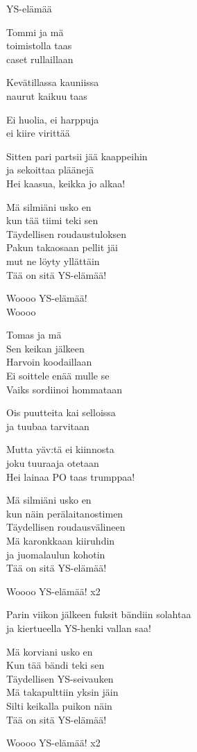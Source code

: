 \begin{song}{YS-elämää}

    Tommi ja mä\\
    toimistolla taas\\
    caset rullaillaan

    Kevätillassa kauniissa\\
    naurut kaikuu taas

    Ei huolia, ei harppuja\\
    ei kiire virittää

    Sitten pari partsii jää kaappeihin\\
    ja sekoittaa pläänejä\\
    Hei kaasua, keikka jo alkaa!

    Mä silmiäni usko en\\
    kun tää tiimi teki sen\\
    Täydellisen roudaustuloksen\\
    Pakun takaosaan pellit jäi\\
    mut ne löyty yllättäin\\
    Tää on sitä YS-elämää!

    Woooo YS-elämää!\\
    Woooo

    Tomas ja mä\\
    Sen keikan jälkeen\\
    Harvoin koodaillaan\\
    Ei soittele enää mulle se\\
    Vaiks sordiinoi hommataan

    Ois puutteita kai selloissa\\
    ja tuubaa tarvitaan

    Mutta yäv:tä ei kiinnosta\\
    joku tuuraaja otetaan\\
    Hei lainaa PO taas trumppaa!

    Mä silmiäni usko en\\
    kun näin perälaitanostimen\\
    Täydellisen roudausvälineen\\
    Mä karonkkaan kiiruhdin\\
    ja juomalaulun kohotin\\
    Tää on sitä YS-elämää!

    Woooo YS-elämää! x2

    Parin viikon jälkeen fuksit bändiin solahtaa\\
    ja kiertueella YS-henki vallan saa!

    Mä korviani usko en\\
    Kun tää bändi teki sen\\
    Täydellisen YS-seivauken\\
    Mä takapulttiin yksin jäin\\
    Silti keikalla puikon näin\\
    Tää on sitä YS-elämää!

    Woooo YS-elämää! x2

\end{song}
